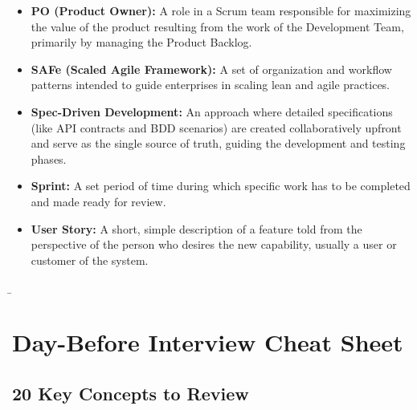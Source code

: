 \documentclass[
  11pt,
  openany,
  oneside]{book}
\begin{document}
\begin{itemize}
\item
  \textbf{PO (Product Owner):} A role in a Scrum team responsible for
  maximizing the value of the product resulting from the work of the
  Development Team, primarily by managing the Product Backlog.
\item
  \textbf{SAFe (Scaled Agile Framework):} A set of organization and
  workflow patterns intended to guide enterprises in scaling lean and
  agile practices.
\item
  \textbf{Spec-Driven Development:} An approach where detailed
  specifications (like API contracts and BDD scenarios) are created
  collaboratively upfront and serve as the single source of truth,
  guiding the development and testing phases.
\item
  \textbf{Sprint:} A set period of time during which specific work has
  to be completed and made ready for review.
\item
  \textbf{User Story:} A short, simple description of a feature told
  from the perspective of the person who desires the new capability,
  usually a user or customer of the system.
\end{itemize}

\bigskip

\b

\section{Day-Before Interview Cheat
Sheet}\label{day-before-interview-cheat-sheet}

\subsection{20 Key Concepts to Review}\label{key-concepts-to-review}
\end{document}
